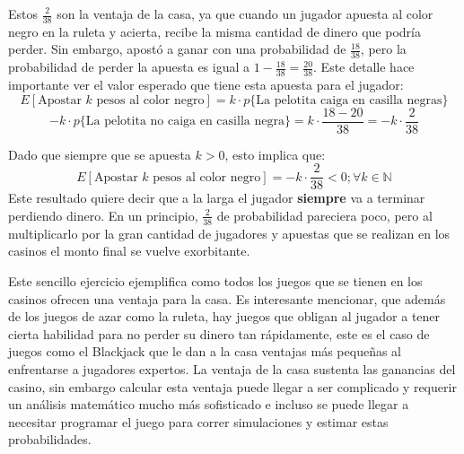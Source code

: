 Estos $\frac{2}{38}$ son la ventaja de la casa, ya que cuando un jugador apuesta al color negro en la ruleta y acierta, recibe la misma cantidad de dinero que podría perder. Sin embargo, apostó a ganar con una probabilidad de $\frac{18}{38}$, pero la probabilidad de perder la apuesta es igual a $1 - \frac{18}{38} = \frac{20}{38}$. Este detalle hace importante ver el valor esperado que tiene esta apuesta para el jugador:
\[E[\text{Apostar }k\text{ pesos al color negro}] = k  \cdot   p\{\text{La pelotita caiga en casilla negras}\} \]
\[- k  \cdot   p\{\text{La pelotita no caiga en casilla negra}\} = k \cdot \frac{18-20}{38}= - k \cdot \frac{2}{38}\]

Dado que siempre que se apuesta $k>0$, esto implica que:
\[E[\text{Apostar }k\text{ pesos al color negro}] = - k \cdot \frac{2}{38} < 0; \forall k \in \mathbb{N} \]
Este resultado quiere decir que a la larga el jugador \textbf{siempre} va a terminar perdiendo dinero.
En un principio, $\frac{2}{38}$ de probabilidad pareciera poco, pero al multiplicarlo por la gran cantidad de jugadores y apuestas que se realizan en los casinos el monto final se vuelve exorbitante.

Este sencillo ejercicio ejemplifica como todos los juegos que se tienen en los casinos ofrecen una ventaja para la casa. Es interesante mencionar, que además de los juegos de azar como la ruleta, hay juegos que obligan al jugador a tener cierta habilidad para no perder su dinero tan rápidamente, este es el caso de juegos como el Blackjack que le dan a la casa ventajas más pequeñas al enfrentarse a jugadores expertos. La ventaja de la casa sustenta las ganancias del casino, sin embargo calcular esta ventaja puede llegar a ser  complicado y requerir un análisis matemático mucho más sofisticado e incluso se puede llegar a necesitar programar el juego para correr simulaciones y estimar estas probabilidades.

